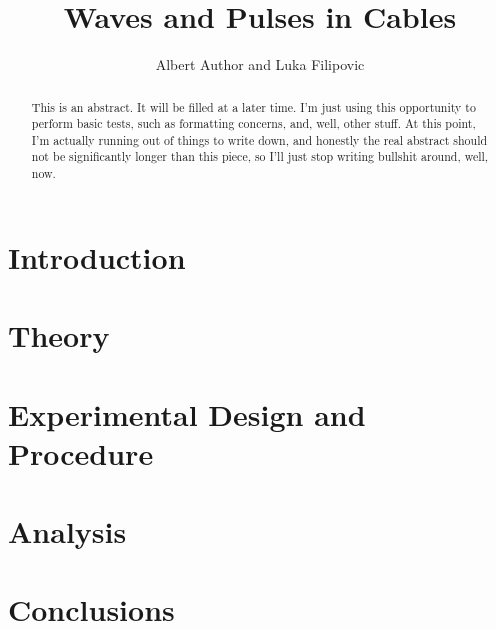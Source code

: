 \documentclass[letterpaper, 10pt, conference]{ieeeconf}
\title{\LARGE \bf Waves and Pulses in Cables}
\author{Albert Author and Luka Filipovic}
\numberwithin{equation}{section}
\begin{document}
\maketitle
\thispagestyle{empty}
\pagestyle{empty}

\begin{abstract}
This is an abstract. It will be filled at a later time. I'm just using this opportunity to perform basic tests, such as formatting concerns, and, well, other stuff. At this point, I'm actually running out of things to write down, and honestly the real abstract should not be significantly longer than this piece, so I'll just stop writing bullshit around, well, now.
\end{abstract}

\section{Introduction}


\section{Theory\label{sec:theory}}


\section{Experimental Design and Procedure}


\section{Analysis}


\section{Conclusions}


\printbibliography
\end{document}

